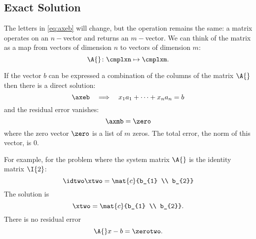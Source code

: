 \subsection{\label{ssec:exact soln}Exact Solution}  %
The letters in \eqref{eq:axeb} will change, but the operation remains the same: a matrix operates on an $n-$vector and returns an $m-$vector. We can think of the  matrix as a map from vectors of dimension $n$ to vectors of dimension $m$:
  \begin{equation*}   %
    \A{} \colon \cmplxn \mapsto \cmplxm .
  \end{equation*}

If the vector $b$ can be expressed a combination of the columns of the matrix $\A{}$ then there is a direct solution:
\begin{equation*}
    \axeb \quad \Longrightarrow \quad x_{1} a_{1} + \cdots + x_{n} a_{n} = b
\end{equation*}
and the residual error  vanishes:
  \begin{equation*}   %
      \axmb = \zero
  \end{equation*}
where the zero vector $\zero$ is a list of $m$ zeros. The total error, the norm of this vector, is 0.

For example, for the problem where the system matrix $\A{}$ is the identity matrix $\I{2}$:
  \begin{equation*}   %
      \idtwo \xtwo = \mat{c}{b_{1} \\ b_{2}}
  \end{equation*}
The solution is
  \begin{equation*}   %
      \xtwo = \mat{c}{b_{1} \\ b_{2}} .
  \end{equation*}
There is no residual error 
  \begin{equation*}   %
      \A{} x - b = \zerotwo .
  \end{equation*}

